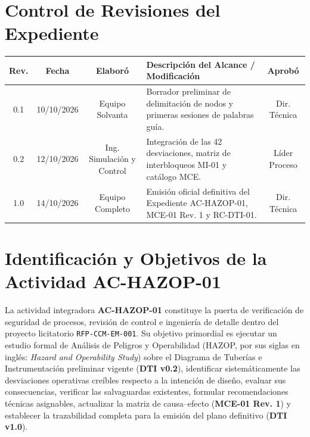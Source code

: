 \documentclass[10pt,letterpaper]{article}
\begin{document}
\section*{Control de Revisiones del Expediente}
\begin{table}[H]
\centering\small
\begin{tabularx}{\textwidth}{c c c X c}
\toprule
\textbf{Rev.} & \textbf{Fecha} & \textbf{Elaboró} & \textbf{Descripción del Alcance / Modificación} & \textbf{Aprobó} \\
\midrule
0.1 & 10/10/2026 & Equipo Solvanta & Borrador preliminar de delimitación de nodos y primeras sesiones de palabras guía. & Dir. Técnica \\
0.2 & 12/10/2026 & Ing. Simulación y Control & Integración de las 42 desviaciones, matriz de interbloqueos MI-01 y catálogo MCE. & Líder Proceso \\
1.0 & 14/10/2026 & Equipo Completo & Emisión oficial definitiva del Expediente AC-HAZOP-01, MCE-01 Rev. 1 y RC-DTI-01. & Dir. Técnica \\
\bottomrule
\end{tabularx}
\end{table}
\vspace{0.3cm}
\tableofcontents
\vspace{0.3cm}
\listoftables
\vspace{0.3cm}
\listoffigures
\newpage

\section{Identificación y Objetivos de la Actividad AC-HAZOP-01}
La actividad integradora \textbf{AC-HAZOP-01} constituye la puerta de verificación de seguridad de procesos, revisión de control e ingeniería de detalle dentro del proyecto licitatorio \texttt{RFP-CCM-EM-001}. Su objetivo primordial es ejecutar un estudio formal de Análisis de Peligros y Operabilidad (HAZOP, por sus siglas en inglés: \textit{Hazard and Operability Study}) sobre el Diagrama de Tuberías e Instrumentación preliminar vigente (\textbf{DTI v0.2}), identificar sistemáticamente las desviaciones operativas creíbles respecto a la intención de diseño, evaluar sus consecuencias, verificar las salvaguardas existentes, formular recomendaciones técnicas asignables, actualizar la matriz de causa--efecto (\textbf{MCE-01 Rev. 1}) y establecer la trazabilidad completa para la emisión del plano definitivo (\textbf{DTI v1.0}).
\end{document}
